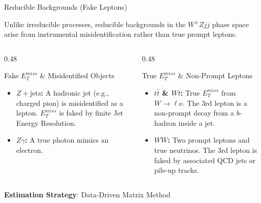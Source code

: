 \begin{frame}{Reducible Backgrounds (Fake Leptons)}
    
    Unlike irreducible processes, reducible backgrounds in the $W^\pm Zjj$ phase space arise from instrumental misidentification rather than true prompt leptons.
    
    \vspace{0.2cm}
    
    \begin{columns}[T]
        \begin{column}{0.48\textwidth}
            \begin{block}{Fake $E_T^{miss}$ \& Misidentified Objects}
                \vspace{0.1cm}
                \begin{itemize}
                    \item \textbf{$Z+\text{jets}$:} A hadronic jet (e.g., charged pion) is misidentified as a lepton. $E_T^{miss}$ is faked by finite Jet Energy Resolution.
                    \item \textbf{$Z\gamma$:} A true photon mimics an electron.
                \end{itemize}
            \end{block}
        \end{column}
        
        \begin{column}{0.48\textwidth}
            \begin{block}{True $E_T^{miss}$ \& Non-Prompt Leptons}
                \vspace{0.1cm}
                \begin{itemize}
                    \item \textbf{$t\bar{t}$ \& $Wt$:} True $E_T^{miss}$ from $W \rightarrow \ell\nu$. The 3rd lepton is a non-prompt decay from a $b$-hadron inside a jet.
                    \item \textbf{$WW$:} Two prompt leptons and true neutrinos. The 3rd lepton is faked by associated QCD jets or pile-up tracks.
                \end{itemize}
            \end{block}
        \end{column}
    \end{columns}
    
    \vspace{0.4cm}
    \begin{center}
         \textbf{Estimation Strategy}: Data-Driven Matrix Method
    \end{center}


\end{frame}

